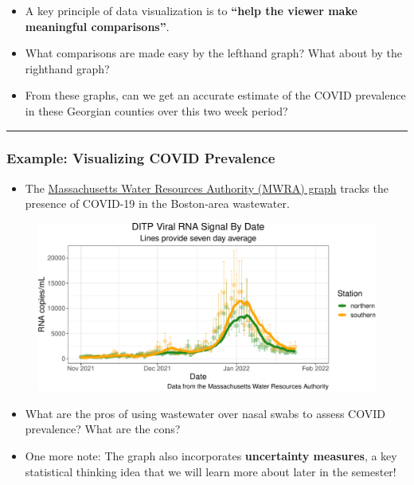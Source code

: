 \documentclass[
  letterpaper,
  DIV=11,
  numbers=noendperiod]{scrartcl}
\providecommand{\tightlist}{%
  \setlength{\itemsep}{0pt}\setlength{\parskip}{0pt}}\usepackage{longtable,booktabs,array}
\begin{document}
\begin{itemize}
\item
  A key principle of data visualization is to \textbf{``help the viewer
  make meaningful comparisons''}.
\item
  What comparisons are made easy by the lefthand graph? What about by
  the righthand graph?
\item
  From these graphs, can we get an accurate estimate of the COVID
  prevalence in these Georgian counties over this two week period?
\end{itemize}

\begin{center}\rule{0.5\linewidth}{0.5pt}\end{center}

\hypertarget{example-visualizing-covid-prevalence-3}{%
\subsubsection{Example: Visualizing COVID
Prevalence}\label{example-visualizing-covid-prevalence-3}}

\begin{itemize}
\tightlist
\item
  The \href{https://www.mwra.com/biobot/biobotdata.htm}{Massachusetts
  Water Resources Authority (MWRA) graph} tracks the presence of
  COVID-19 in the Boston-area wastewater.
\end{itemize}

\begin{figure}

{\centering \includegraphics[width=28.125in,height=\textheight]{stat100_wk01wed_files/figure-pdf/unnamed-chunk-4-1.pdf}

}

\end{figure}

\begin{itemize}
\item
  What are the pros of using wastewater over nasal swabs to assess COVID
  prevalence? What are the cons?
\item
  One more note: The graph also incorporates \textbf{uncertainty
  measures}, a key statistical thinking idea that we will learn more
  about later in the semester!
\end{itemize}
\end{document}
